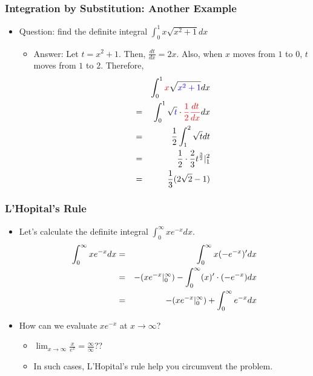 \documentclass[pdflatex, 12pt]{beamer}
\begin{document}
\begin{frame}
\frametitle{Integration by Substitution: Another Example}
\begin{itemize}
\item Question: find the definite integral $\int^1_0 x\sqrt{x^2 + 1}dx$
\vspace{0.4cm}
 \begin{itemize}
 \item Answer: Let $t = x^2 + 1$. Then, $\frac{dt}{dx} = 2x$. Also, when $x$ moves from $1$ to $0$, $t$ moves from $1$ to $2$. Therefore,
  \begin{eqnarray}
  && \int^1_0 {\color{red} x}\sqrt{\color{blue} x^2 + 1}dx \notag \\
  &=& \int^1_0 \sqrt{\color{blue} t} \cdot {\color{red} \frac{1}{2}\frac{dt}{dx}} dx \notag \\
  &=& \frac{1}{2} \int^2_1 \sqrt{t} dt \notag \\
  &=& \frac{1}{2} \cdot \frac{2}{3} t^{\frac{3}{2}}|^2_1 \notag \\
  &=& \frac{1}{3} (2\sqrt{2} - 1) \notag 
  \end{eqnarray}
 \end{itemize}
\end{itemize}
\end{frame}

\begin{frame}
\frametitle{L'Hopital's Rule}
\begin{itemize}
\item Let's calculate the definite integral $\int^{\infty}_0 xe^{-x} dx$.
 \begin{eqnarray}
 \int^{\infty}_0 xe^{-x} dx &=& \int^{\infty}_0 x(-e^{-x})' dx \notag \\
 &=& -(xe^{-x}|^{\infty}_0)  - \int^{\infty}_0 (x)' \cdot (-e^{-x}) dx \notag \\
 &=& -(xe^{-x}|^{\infty}_0)  + \int^{\infty}_0 e^{-x} dx \notag
 \end{eqnarray}
\item How can we evaluate $xe^{-x}$ at $x \to \infty$?
 \begin{itemize}
 \item $\lim_{x \to \infty} \frac{x}{e^x} = \frac{\infty}{\infty}$??
 \item In such cases, L'Hopital's rule help you circumvent the problem.
 \end{itemize}
\end{itemize}
\end{frame}
\end{document}
